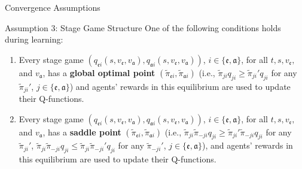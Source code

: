 \documentclass[10pt, aspectratio=169]{beamer}
\begin{document}
\begin{frame}{Convergence Assumptions}
    \begin{block}{Assumption 3: Stage Game Structure}
        One of the following conditions holds during learning: 
        \begin{enumerate}
            \item Every stage game $(q_{\mathfrak{e}i}(s, v_{\mathfrak{e}}, v_{\mathfrak{a}}), q_{\mathfrak{a}i}(s, v_{\mathfrak{e}}, v_{\mathfrak{a}}))$, $i \in \{\mathfrak{e}, \mathfrak{a}\}$, for all $t, s, v_{\mathfrak{e}},$ and $v_{\mathfrak{a}}$, has a \textbf{global optimal point} $(\tilde{\pi}_{\mathfrak{e}i}, \tilde{\pi}_{\mathfrak{a}i})$ (i.e., $\tilde{\pi}_{ji}q_{ji} \geq \tilde{\pi}_{ji}'q_{ji}$ for any $\tilde{\pi}_{ji}'$, $j \in \{\mathfrak{e}, \mathfrak{a}\}$) and agents' rewards in this equilibrium are used to update their Q-functions. 
            \item Every stage game $(q_{\mathfrak{e}i}(s, v_{\mathfrak{e}}, v_{\mathfrak{a}}), q_{\mathfrak{a}i}(s, v_{\mathfrak{e}}, v_{\mathfrak{a}}))$, $i \in \{\mathfrak{e}, \mathfrak{a}\}$, for all $t, s, v_{\mathfrak{e}},$ and $v_{\mathfrak{a}}$, has a \textbf{saddle point} $(\tilde{\pi}_{\mathfrak{e}i}, \tilde{\pi}_{\mathfrak{a}i})$ (i.e., $\tilde{\pi}_{ji}\tilde{\pi}_{-ji}q_{ji} \geq \tilde{\pi}_{ji}'\tilde{\pi}_{-ji}q_{ji}$ for any $\tilde{\pi}_{ji}'$, $\tilde{\pi}_{ji}\tilde{\pi}_{-ji}q_{ji} \leq \tilde{\pi}_{ji}\tilde{\pi}_{-ji}'q_{ji}$ for any $\tilde{\pi}_{-ji}'$, $j \in \{\mathfrak{e}, \mathfrak{a}\}$), and agents' rewards in this equilibrium are used to update their Q-functions. 
        \end{enumerate}
    \end{block}


\end{frame}

\end{document}
